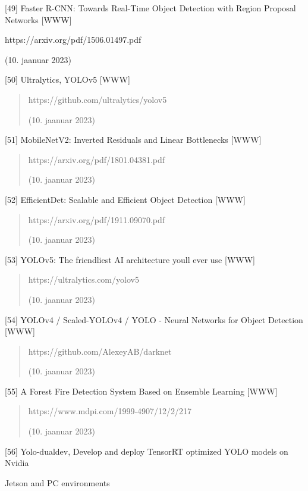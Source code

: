 \documentclass[12pt,a4paper]{report}
\begin{document}
{[}49{]} Faster R-CNN: Towards Real-Time Object Detection with Region Proposal Networks {[}WWW{]}

https://arxiv.org/pdf/1506.01497.pdf

(10. jaanuar 2023)

{[}50{]} Ultralytics, YOLOv5 {[}WWW{]}

\begin{quote}
https://github.com/ultralytics/yolov5

(10. jaanuar 2023)
\end{quote}

{[}51{]} MobileNetV2: Inverted Residuals and Linear Bottlenecks {[}WWW{]}

\begin{quote}
https://arxiv.org/pdf/1801.04381.pdf

(10. jaanuar 2023)
\end{quote}

{[}52{]} EfficientDet: Scalable and Efficient Object Detection {[}WWW{]}

\begin{quote}
https://arxiv.org/pdf/1911.09070.pdf

(10. jaanuar 2023)
\end{quote}

{[}53{]} YOLOv5: The friendliest AI architecture you\textquotesingle ll ever use {[}WWW{]}

\begin{quote}
https://ultralytics.com/yolov5

(10. jaanuar 2023)
\end{quote}

{[}54{]} YOLOv4 / Scaled-YOLOv4 / YOLO - Neural Networks for Object Detection {[}WWW{]}

\begin{quote}
https://github.com/AlexeyAB/darknet

(10. jaanuar 2023)
\end{quote}

{[}55{]} A Forest Fire Detection System Based on Ensemble Learning {[}WWW{]}

\begin{quote}
https://www.mdpi.com/1999-4907/12/2/217

(10. jaanuar 2023)
\end{quote}

{[}56{]} Yolo-dualdev, Develop and deploy TensorRT optimized YOLO models on Nvidia

Jetson and PC environments
\end{document}
